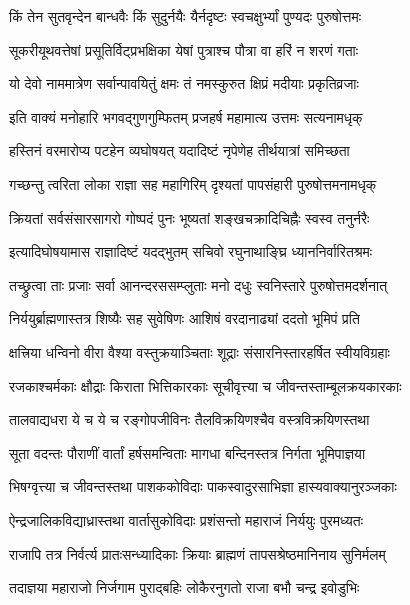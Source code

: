 \twolineshloka
{किं तेन सुतवृन्देन बान्धवैः किं सुदुर्नयैः}
{यैर्नदृष्टः स्वचक्षुर्भ्यां पुण्यदः पुरुषोत्तमः}%

\twolineshloka
{सूकरीयूथवत्तेषां प्रसूतिर्विट्प्रभक्षिका}
{येषां पुत्राश्च पौत्रा वा हरिं न शरणं गताः}%

\twolineshloka
{यो देवो नाममात्रेण सर्वान्पावयितुं क्षमः}
{तं नमस्कुरुत क्षिप्रं मदीयाः प्रकृतिव्रजाः}%

\twolineshloka
{इति वाक्यं मनोहारि भगवद्गुणगुम्फितम्}
{प्रजहर्ष महामात्य उत्तमः सत्यनामधृक्}%

\twolineshloka
{हस्तिनं वरमारोप्य पटहेन व्यघोषयत्}
{यदादिष्टं नृपेणेह तीर्थयात्रां समिच्छता}%

\twolineshloka
{गच्छन्तु त्वरिता लोका राज्ञा सह महागिरिम्}
{दृश्यतां पापसंहारी पुरुषोत्तमनामधृक्}%

\twolineshloka
{क्रियतां सर्वसंसारसागरो गोष्पदं पुनः}
{भूष्यतां शङ्खचक्रादिचिह्नैः स्वस्व तनुर्नरैः}%

\twolineshloka
{इत्यादिघोषयामास राज्ञादिष्टं यदद्भुतम्}
{सचिवो रघुनाथाङ्घ्रि ध्याननिर्वारितश्रमः}%

\twolineshloka
{तच्छ्रुत्वा ताः प्रजाः सर्वा आनन्दरससम्प्लुताः}
{मनो दधुः स्वनिस्तारे पुरुषोत्तमदर्शनात्}%

\twolineshloka
{निर्ययुर्ब्राह्मणास्तत्र शिष्यैः सह सुवेषिणः}
{आशिषं वरदानाढ्यां ददतो भूमिपं प्रति}%

\twolineshloka
{क्षत्त्रिया धन्विनो वीरा वैश्या वस्तुक्रयाञ्चिताः}
{शूद्राः संसारनिस्तारहर्षित स्वीयविग्रहाः}%

\twolineshloka
{रजकाश्चर्मकाः क्षौद्राः किराता भित्तिकारकाः}
{सूचीवृत्त्या च जीवन्तस्ताम्बूलक्रयकारकाः}%

\twolineshloka
{तालवाद्यधरा ये च ये च रङ्गोपजीविनः}
{तैलविक्रयिणश्चैव वस्त्रविक्रयिणस्तथा}%

\twolineshloka
{सूता वदन्तः पौराणीं वार्तां हर्षसमन्विताः}
{मागधा बन्दिनस्तत्र निर्गता भूमिपाज्ञया}%

\twolineshloka
{भिषग्वृत्त्या च जीवन्तस्तथा पाशककोविदाः}
{पाकस्वादुरसाभिज्ञा हास्यवाक्यानुरञ्जकाः}%

\twolineshloka
{ऐन्द्रजालिकविद्याध्रास्तथा वार्तासुकोविदाः}
{प्रशंसन्तो महाराजं निर्ययुः पुरमध्यतः}%

\twolineshloka
{राजापि तत्र निर्वर्त्य प्रातःसन्ध्यादिकाः क्रियाः}
{ब्राह्मणं तापसश्रेष्ठमानिनाय सुनिर्मलम्}%

\twolineshloka
{तदाज्ञया महाराजो निर्जगाम पुराद्बहिः}
{लोकैरनुगतो राजा बभौ चन्द्र इवोडुभिः}%

